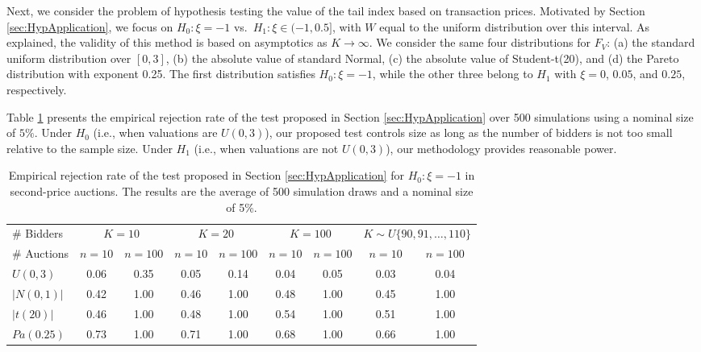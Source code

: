 
Next, we consider the problem of hypothesis testing the value of the tail index based on transaction prices. Motivated by Section \ref{sec:HypApplication}, we focus on $H_0:\xi = -1$ vs.\ $H_1:\xi \in (-1,0.5]$, with $W$ equal to the uniform distribution over this interval. As explained, the validity of this method is based on asymptotics as $K\to\infty$. We consider the same four distributions for $F_V$: (a) the standard uniform distribution over $[0,3]$, (b) the absolute value of standard Normal, (c) the absolute value of Student-t(20), and (d) the Pareto distribution with exponent 0.25. The first distribution satisfies $H_0:\xi = -1$, while the other three belong to $H_1$ with $\xi = 0$, $0.05$, and $0.25$, respectively.

Table \ref{tbl:sp-test} presents the empirical rejection rate of the test proposed in Section \ref{sec:HypApplication} over 500 simulations using a nominal size of $5\%$. Under $H_0$ (i.e., when valuations are $U(0,3)$), our proposed test controls size as long as the number of bidders is not too small relative to the sample size. Under $H_1$ (i.e., when valuations are not $U(0,3)$), our methodology provides reasonable power.

\begin{table}[ht]
\centering
\renewcommand{\arraystretch}{1.5}
\begin{tabular}{lcccccccc}
\hline\hline
\# Bidders & \multicolumn{2}{c}{$K=10$}   & \multicolumn{2}{c}{$K=20$}   & \multicolumn{2}{c}{$K=100$} & \multicolumn{2}{c}{ $K\sim U\{90,91,\dots,110 \}$  } \\ 
\# Auctions & $n=10$ & $n  = 100$   & $n=10$ & $n  = 100$   & $n=10$ & $n  = 100$  & $n=10$ & $n  = 100$\\ \hline
$U(0,3)$               & 0.06 & 0.35 &   0.05 & 0.14 &  0.04 & 0.05 & 0.03 & 0.04 \\ 
{$\vert N(0,1) \vert$} & 0.42 & 1.00 &   0.46 & 1.00 &  0.48 & 1.00 & 0.45 & 1.00 \\ 
{$\vert t(20) \vert$}  & 0.46 & 1.00 &   0.48 & 1.00 &  0.54 & 1.00 & 0.51 & 1.00 \\ 
$Pa(0.25) $            & 0.73 & 1.00 &   0.71 & 1.00 &  0.68 & 1.00 & 0.66 & 1.00 \\ 
\hline\hline
\end{tabular}
\caption{Empirical rejection rate of the test proposed in Section \ref{sec:HypApplication} for $H_0:\xi = -1$ in second-price auctions. The results are the average of 500 simulation draws and a nominal size of 5\%.}\label{tbl:sp-test}
\end{table}

